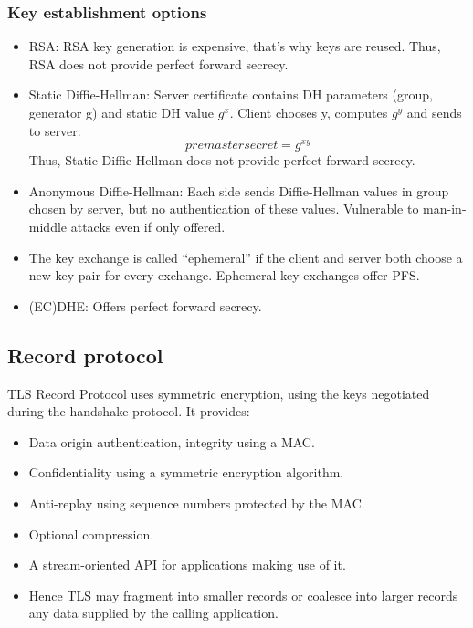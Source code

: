 \documentclass[11pt,oneside,a4paper]{article}
\begin{document}
\subsubsection{Key establishment options}

\vspace{-\topsep}
\begin{itemize}
	\setlength{\itemsep}{0pt}
	\setlength{\parskip}{0pt}
	\item RSA: RSA key generation is expensive, that's why keys are reused. Thus, RSA does not provide perfect forward secrecy.
	\item Static Diffie-Hellman: Server certificate contains DH parameters (group, generator g)
	and static DH value $g^x$. Client chooses y, computes $g^y$ and sends to server. $$premastersecret = g^{xy}$$
	Thus, Static Diffie-Hellman does not provide perfect forward secrecy.
	\item Anonymous Diffie-Hellman: Each side sends Diffie-Hellman values in group chosen by
	server, but no authentication of these values. Vulnerable to man-in-middle attacks even if only offered.
	\item The key exchange is called “ephemeral” if the client and server both choose a new key pair for every exchange. Ephemeral key exchanges offer PFS.
	\item (EC)DHE: Offers perfect forward secrecy.
\end{itemize}
\vspace{-\topsep}

\newpage

\subsection{Record protocol}

TLS Record Protocol uses symmetric encryption, using the keys negotiated during the handshake protocol. It provides:

\vspace{-\topsep}
\begin{itemize}
	\setlength{\itemsep}{0pt}
	\setlength{\parskip}{0pt}
	\item Data origin authentication, integrity using a MAC.
	\item Confidentiality using a symmetric encryption algorithm.
	\item Anti-replay using sequence numbers protected by the MAC.
	\item Optional compression.
	\item A stream-oriented API for applications making use of it.
	\item Hence TLS may fragment into smaller records or coalesce into larger records any data supplied by the calling application.
\end{itemize}
\vspace{-\topsep}
\end{document}
